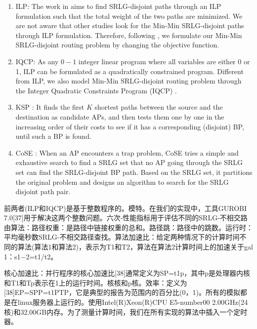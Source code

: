 \begin{enumerate}
  \item ILP: The work in \cite{hu2003diverse}  aims to find SRLG-disjoint paths through an ILP formulation such that the total weight of the two paths are minimized. We are not aware that other studies look for the Min-Min SRLG-disjoint paths through ILP formulation. Therefore, following \cite{hu2003diverse}, we formulate  our Min-Min SRLG-disjoint routing problem by changing the objective function.
  \item IQCP: As any $0-1$ integer linear program where all variables are either 0 or 1,  ILP can be formulated as a quadratically constrained program. Different from ILP, we also model Min-Min SRLG-disjoint routing problem through the Integer Quadratic Constraints Program (IQCP) \cite{hu2003diverse}.
  \item KSP \cite{eppstein1998finding}: It finds the first $K$ shortest paths between the source and the destination as candidate APs, and then tests them one by one in the increasing order of their costs to see if it has a corresponding (disjoint) BP, until such a BP is found.
  \item CoSE \cite{rostami2007cose}: When an AP encounters a trap problem, CoSE tries a simple and exhaustive search to find a SRLG set that no AP going through the SRLG set can find the SRLG-disjoint BP path. Based on the SRLG set, it partitions the original problem  and designs an algorithm to search for the SRLG disjoint path pair.
\end{enumerate}

前两者(ILP和IQCP)是基于整数程序的。模特。在我们的实现中，工具GUROBI 7.0[37]用于解决这两个整数问题。六次-性能指标用于评估不同的SRLG-不相交路由算法：路径权重：是路径中链接权重的总和。路径跳：路径中的跳数。运行时：平均毫秒数SRLG-不相交路径查找。算法加速比：给定两种情况下的计算时间不同的算法(算法1和算法2)，表示为T1和T2，算法在算法2计算时间上的加速关于gal 1：s1−2=t1/t2。


核心加速比：并行程序的核心加速比[38]通常定义为SP=t1p，其中p是处理器内核和T1和Tp表示在1上的运行时间。核核和p核。效率：定义为[38]EP=SPP=t1PTP，它是典型的报告为范围内的百分比(0，1)。所有的模拟都是在linux服务器上运行的。使用Intel(R)Xeon(R)CPU E5-number00 2.00GHz(24核)和32.00GB内存。为了测量计算时间，我们在所有实现的算法中插入一个定时器。


